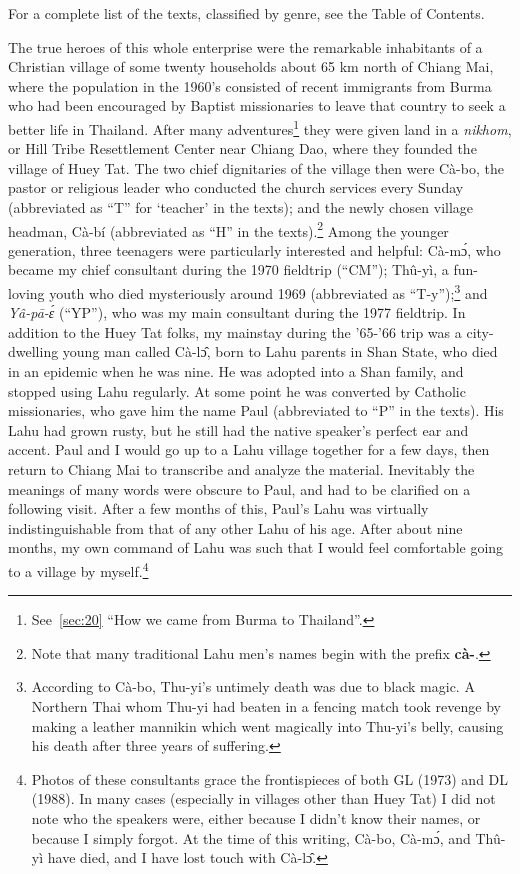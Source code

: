 For a complete list of the texts, classified by genre, see the Table of
Contents.

The true heroes of this whole enterprise were the remarkable
inhabitants of a Christian village of some twenty households about 65
km north of Chiang Mai, where the population in the 1960's consisted
of recent immigrants from Burma who had been encouraged by Baptist
missionaries to leave that country to seek a better life in
Thailand. After many adventures\footnote{See~\ref{sec:20} ``How we came
  from Burma to Thailand''.} they were given land in a \emph{nikhom},
or Hill Tribe Resettlement Center near Chiang Dao, where they founded
the village of Huey Tat. The two chief dignitaries of the village then
were Cà-bo, the pastor or religious leader who conducted the
church services every Sunday (abbreviated as ``T'' for `teacher' in the
texts); and the newly chosen village headman, Cà-bí
(abbreviated as ``H'' in the texts).\footnote{Note that many traditional
  Lahu men's names begin with the prefix \textbf{cà-}.}  Among the
younger generation, three teenagers were particularly interested and
helpful: Cà-mɔ́, who became my chief consultant during the 1970
fieldtrip (``CM''); Thû-yì, a fun-loving youth who died
mysteriously around 1969 (abbreviated as ``T-y'');\footnote{According to
  Cà-bo, Thu-yi's untimely death was due to black magic. A Northern
  Thai whom Thu-yi had beaten in a fencing match took revenge by
  making a leather mannikin which went magically into Thu-yi's belly,
  causing his death after three years of suffering.} and \emph{Yâ-pā-ɛ́
}(``YP''), who was my main consultant during the 1977 fieldtrip. In
addition to the Huey Tat folks, my mainstay during the '65-'66 trip
was a city-dwelling young man called Cà-lɔ̂, born to Lahu
parents in Shan State, who died in an epidemic when he was nine. He
was adopted into a Shan family, and stopped using Lahu regularly. At
some point he was converted by Catholic missionaries, who gave him the
name Paul (abbreviated to ``P'' in the texts). His Lahu had grown rusty,
but he still had the native speaker's perfect ear and accent. Paul and
I would go up to a Lahu village together for a few days, then return
to Chiang Mai to transcribe and analyze the material. Inevitably the
meanings of many words were obscure to Paul, and had to be clarified
on a following visit. After a few months of this, Paul's Lahu was
virtually indistinguishable from that of any other Lahu of his
age. After about nine months, my own command of Lahu was such that I
would feel comfortable going to a village by myself.\footnote{Photos
  of these consultants grace the frontispieces of both GL (1973) and
  DL (1988). In many cases (especially in villages other than Huey
  Tat) I did not note who the speakers were, either because I didn't
  know their names, or because I simply forgot. At the time of this
  writing, Cà-bo, Cà-mɔ́, and Thû-yì have died, and I have lost touch
  with Cà-lɔ̂.}

